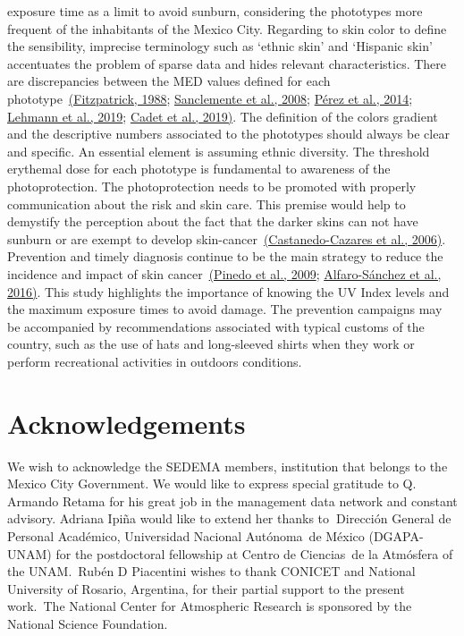 \documentclass[10pt]{article}
\begin{document}
exposure time as a limit to avoid sunburn, considering the phototypes
more frequent of the inhabitants of the Mexico City. Regarding to skin
color to define the sensibility, imprecise terminology such as `ethnic
skin' and `Hispanic skin' accentuates the problem of sparse data and
hides relevant characteristics. There are discrepancies between the MED
values defined for each phototype~\hyperref[csl:30]{(Fitzpatrick, 1988}; \hyperref[csl:70]{Sanclemente et al., 2008}; \hyperref[csl:31]{Pérez et al., 2014}; \hyperref[csl:32]{Lehmann et al., 2019}; \hyperref[csl:62]{Cadet et al., 2019)}. The definition of
the colors gradient and the descriptive numbers associated to the
phototypes should always be clear and specific. An essential element is
assuming ethnic diversity. The threshold erythemal dose for each
phototype is fundamental to awareness of the photoprotection. The
photoprotection needs to be promoted with properly communication about
the risk and skin care. This premise would help to demystify the
perception about the fact that the darker skins can not have sunburn or
are exempt to develop skin-cancer~\hyperref[csl:40]{(Castanedo-Cazares et al., 2006)}. Prevention and
timely diagnosis continue to be the main strategy to reduce the
incidence and impact of skin cancer~\hyperref[csl:71]{(Pinedo et al., 2009}; \hyperref[csl:72]{Alfaro-Sánchez et al., 2016)}. This study
highlights the importance of knowing the UV Index levels and the maximum
exposure times to avoid damage. The prevention campaigns may be
accompanied by recommendations associated with typical customs of the
country, such as the use of hats and long-sleeved shirts when they work
or perform recreational activities in outdoors conditions.~

\section*{Acknowledgements}

{\label{667124}}

We wish to acknowledge the SEDEMA members, institution that belongs to
the Mexico City Government. We would like to express special gratitude
to Q. Armando Retama for his great job in the management data network
and constant advisory. Adriana Ipiña would like to extend her thanks
to\textbf{~}Dirección General de Personal Académico, Universidad
Nacional Autónoma~de México (DGAPA-UNAM) for the postdoctoral fellowship
at Centro de Ciencias~de la Atmósfera of the UNAM.~Rubén D Piacentini
wishes to thank CONICET and National University of Rosario, Argentina,
for their partial support to the present work.~The National Center for
Atmospheric Research is sponsored by the National Science Foundation.
\end{document}
